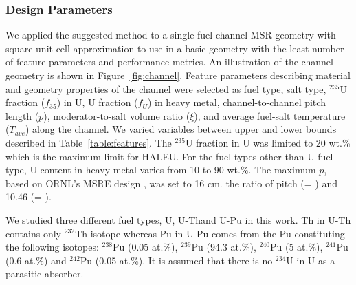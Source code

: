 \subsubsection{Design Parameters}

    We applied the suggested method to a single fuel channel \gls{MSR} geometry with square unit cell approximation to use in a basic geometry with the least number of feature parameters and performance metrics. An illustration of the channel geometry is shown in Figure~\ref{fig:channel}. \DIFaddbegin {}\DIFaddend Feature parameters describing \DIFdelbegin {}\DIFdelend material and geometry properties of the \DIFdelbegin {}\DIFdelend channel were selected as fuel type, salt type, $^{235}$U fraction ($f_{35}$) in U, U fraction ($f_{U}$) in heavy metal, channel-to-channel pitch length ($p$), moderator-to-salt volume ratio ($\xi$), and average fuel-salt temperature ($T_{ave}$) along the channel. We varied \DIFdelbegin {}\DIFdelend \DIFaddbegin {}\DIFaddend variables between upper and lower bounds described in Table~\ref{table:features}. The $^{235}$U fraction in U was limited to 20 wt.\% which is the maximum limit for \gls{HALEU}. For the fuel types other than U fuel type, U content in heavy metal varies from 10 to 90 wt.\%. The maximum $p$, based on \gls{ORNL}'s \gls{MSRE} design \DIFaddbegin {}\DIFaddend , was set to 16 cm. \DIFdelbegin {}\DIFdelend \DIFaddbegin {}\DIFaddend the ratio of pitch \DIFdelbegin {}\DIFdelend \DIFaddbegin {} (\DIFdelbegin {}\DIFdelend \DIFaddbegin {}\DIFaddend = \DIFdelbegin {}\DIFdelend \DIFaddbegin {}\DIFaddend ) and 10.46 (\DIFdelbegin {}\DIFdelend \DIFaddbegin {}\DIFaddend = \DIFdelbegin {}\DIFdelend \DIFaddbegin {}\DIFaddend ).

    We studied three different fuel types, U, U-Th\DIFaddbegin \DIFadd{, }\DIFaddend and U-Pu in this work. Th in U-Th contains only $^{232}$Th isotope whereas Pu in U-Pu comes from the \DIFdelbegin {}\DIFdelend \DIFaddbegin {}\DIFaddend Pu constituting the following isotopes: $^{238}$Pu (0.05 at.\%), $^{239}$Pu (94.3 at.\%), $^{240}$Pu (5 at.\%), $^{241}$Pu (0.6 at.\%) and $^{242}$Pu (0.05 at.\%). It is assumed that there is no $^{234}$U in U as a parasitic absorber.

